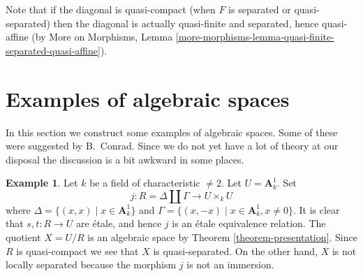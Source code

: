 \documentclass{stacks-project}
\theoremstyle{plain}
\theoremstyle{definition}
\newtheorem{example}[subsection]{Example}
\theoremstyle{remark}
\numberwithin{equation}{subsection}
\begin{document}
\noindent
Note that if the diagonal is quasi-compact (when $F$ is separated or
quasi-separated) then the diagonal is actually
quasi-finite and separated, hence quasi-affine (by More on Morphisms,
Lemma \ref{more-morphisms-lemma-quasi-finite-separated-quasi-affine}).








\section{Examples of algebraic spaces}
\label{section-examples}

\noindent
In this section we construct some examples of algebraic spaces.
Some of these were suggested by B.\ Conrad.
Since we do not yet have a lot of theory at our disposal the
discussion is a bit awkward in some places.

\begin{example}
\label{example-affine-line-involution}
Let $k$ be a field of characteristic $\not = 2$. Let $U = \mathbf{A}^1_k$. Set
$$
j : R = \Delta \amalg \Gamma \longrightarrow U \times_k U
$$
where $\Delta = \{(x, x) \mid x \in \mathbf{A}^1_k\}$ and
$\Gamma = \{(x, -x) \mid x \in \mathbf{A}^1_k, x \not = 0\}$.
It is clear that $s, t : R \to U$ are \'etale, and hence
$j$ is an \'etale equivalence relation.
The quotient $X = U/R$ is an algebraic space by
Theorem \ref{theorem-presentation}.
Since $R$ is quasi-compact we see that $X$ is quasi-separated.
On the other hand, $X$ is not locally separated because
the morphism $j$ is not an immersion.
\end{example}
\end{document}
